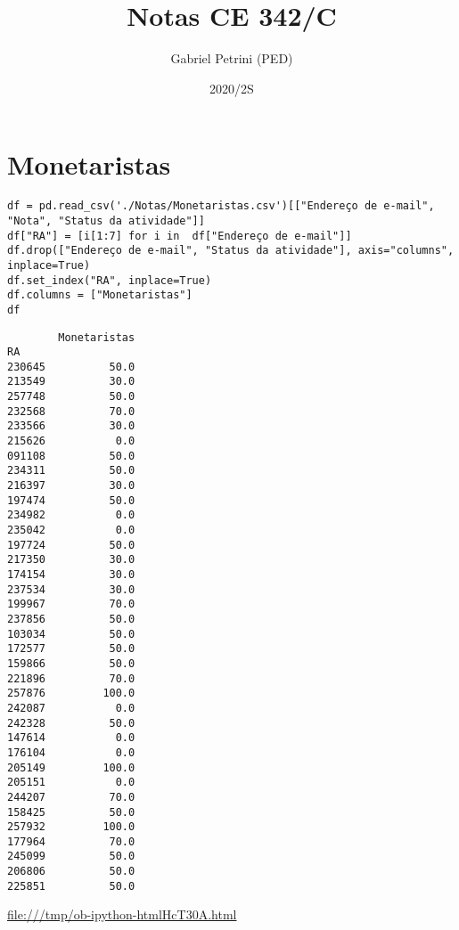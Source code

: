 \documentclass[11pt]{article}
\author{Gabriel Petrini (PED)}
\date{2020/2S}
\title{Notas CE 342/C}
\begin{document}
\maketitle

\section{Monetaristas}
\label{sec:orgc86dc73}

\begin{verbatim}
df = pd.read_csv('./Notas/Monetaristas.csv')[["Endereço de e-mail", "Nota", "Status da atividade"]]
df["RA"] = [i[1:7] for i in  df["Endereço de e-mail"]]
df.drop(["Endereço de e-mail", "Status da atividade"], axis="columns", inplace=True)
df.set_index("RA", inplace=True)
df.columns = ["Monetaristas"]
df
\end{verbatim}

\begin{verbatim}
        Monetaristas
RA                  
230645          50.0
213549          30.0
257748          50.0
232568          70.0
233566          30.0
215626           0.0
091108          50.0
234311          50.0
216397          30.0
197474          50.0
234982           0.0
235042           0.0
197724          50.0
217350          30.0
174154          30.0
237534          30.0
199967          70.0
237856          50.0
103034          50.0
172577          50.0
159866          50.0
221896          70.0
257876         100.0
242087           0.0
242328          50.0
147614           0.0
176104           0.0
205149         100.0
205151           0.0
244207          70.0
158425          50.0
257932         100.0
177964          70.0
245099          50.0
206806          50.0
225851          50.0
\end{verbatim}


\url{file:///tmp/ob-ipython-htmlHcT30A.html}
\end{document}
